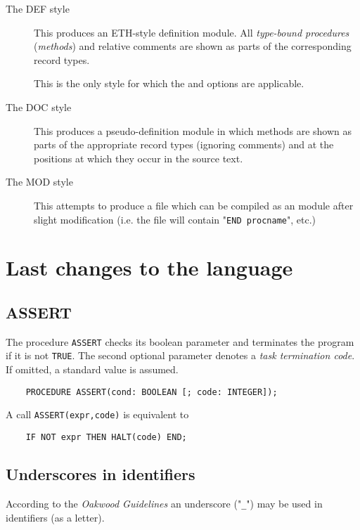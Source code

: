 \begin{description}
\item[The DEF style] \mbox{}

This produces an ETH-style definition module.
All {\em type-bound procedures} ({\em methods})
and relative comments are shown as parts of
the corresponding record types.

This is the only style for which the
 and 
options are applicable.

\item[The DOC style] \mbox{}

This produces a pseudo-definition module in which methods are shown as
parts of the appropriate record types (ignoring comments) and at the
positions at which they occur in the source text.

\item[The MOD style] \mbox{}

This attempts to produce a file which can be compiled as an \ot{}
module after slight modification (i.e. the file will contain
"\verb'END procname'", etc.)
\end{description}

\section{Last changes to the language}\label{o2:changes}

\subsection{ASSERT}\label{o2:ASSERT}

The procedure \verb'ASSERT' checks its boolean parameter and terminates
the program if it is not \verb'TRUE'. The second optional parameter
denotes a {\em task termination code}. If omitted, a standard value
is assumed.

\verb'    PROCEDURE ASSERT(cond: BOOLEAN [; code: INTEGER]);'

A call \verb|ASSERT(expr,code)| is equivalent to

\verb'    IF NOT expr THEN HALT(code) END;'

\subsection{Underscores in identifiers}

According to the {\em Oakwood Guidelines} an underscore ("\verb'_'") may
be used in identifiers (as a letter).

